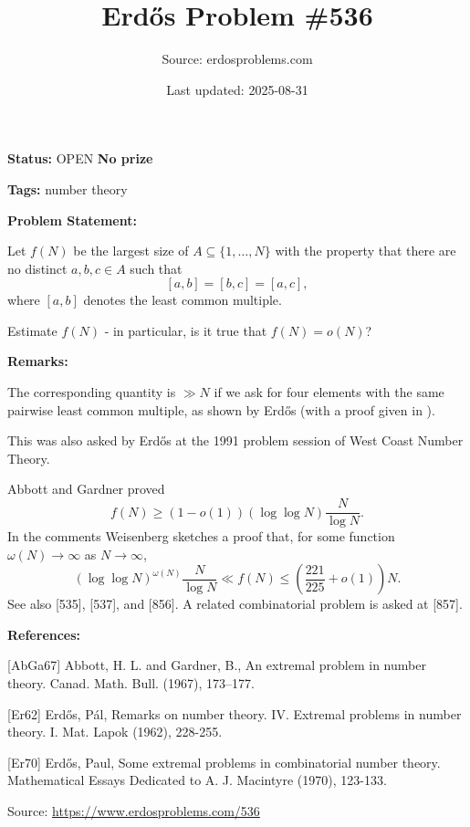 \documentclass{article}
\title{Erd\H{o}s Problem \#536}
\date{Last updated: 2025-08-31}
\author{Source: erdosproblems.com}
\begin{document}
\maketitle

\noindent\textbf{Status:} OPEN \quad \textbf{No prize}

\noindent\textbf{Tags:} number theory

\medskip
\noindent\textbf{Problem Statement:}

Let $f(N)$ be the largest size of $A\subseteq \{1,\ldots,N\}$ with the property that there are no distinct $a,b,c\in A$ such that\[[a,b]=[b,c]=[a,c],\]where $[a,b]$ denotes the least common multiple.

Estimate $f(N)$ - in particular, is it true that $f(N)=o(N)$?

\bigskip
\noindent\textbf{Remarks:}

The corresponding quantity is $\gg N$ if we ask for four elements with the same pairwise least common multiple, as shown by Erd\H{o}s \cite{Er62} (with a proof given in \cite{Er70}).

This was also asked by Erd\H{o}s at the 1991 problem session of West Coast Number Theory.

Abbott and Gardner \cite{AbGa67} proved\[f(N) \geq (1-o(1))(\log\log N)\frac{N}{\log N}.\]In the comments Weisenberg sketches a proof that, for some function $\omega(N)\to \infty$ as $N\to \infty$,\[(\log\log N)^{\omega(N)}\frac{N}{\log N}\ll f(N) \leq \left(\frac{221}{225}+o(1)\right)N.\]See also [535], [537], and [856]. A related combinatorial problem is asked at [857].

\bigskip
\noindent\textbf{References:}

[AbGa67] Abbott, H. L. and Gardner, B., An extremal problem in number theory. Canad. Math. Bull. (1967), 173--177.
 
 [Er62] Erd\H{o}s, P\'{a}l, Remarks on number theory. IV. Extremal problems in number theory. I. Mat. Lapok (1962), 228-255.
 
 [Er70] Erd\H{o}s, Paul, Some extremal problems in combinatorial number theory. Mathematical Essays Dedicated to A. J. Macintyre (1970), 123-133.

\bigskip
\noindent\small{Source: \url{https://www.erdosproblems.com/536}}
\end{document}
